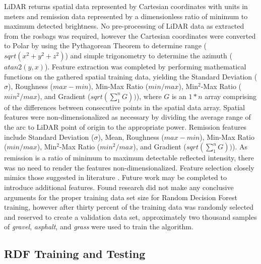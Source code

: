 \documentclass[journal,onecolumn]{IEEEtran}
\begin{document}
			{LiDAR returns spatial data represented by Cartesian coordinates with units in meters and remission data represented by a dimensionless ratio of minimum to maximum detected brightness. No pre-processing of LiDAR data as extracted from the rosbags was required, however the Cartesian coordinates were converted to Polar by using the Pythagorean Theorem to determine range ($sqrt(x^{2} + y^{2} + z^{2})$) and simple trigonometry to determine the azimuth ($atan2(y,x)$). Feature extraction was completed by performing mathematical functions on the gathered spatial training data, yielding the Standard Deviation ($\sigma$), Roughness ($max - min$), Min-Max Ratio ($min / max$), Min$^{2}$-Max Ratio ($min^2 / max$), and Gradient ($sqrt(\sum_{1}^{n} G))$), where $G$ is an $1*n$ array comprising of the differences between consecutive points in the spatial data array. Spatial features were non-dimensionalized as necessary by dividing the average range of the arc to LiDAR point of origin to the appropriate power. Remission features include Standard Deviation ($\sigma$), Mean, Roughness ($max - min$), Min-Max Ratio ($min / max$), Min$^{2}$-Max Ratio ($min^2 / max$), and Gradient ($sqrt(\sum_{1}^{n} G))$). As remission is a ratio of minimum to maximum detectable reflected intensity, there was no need to render the features non-dimensionalized. Feature selection closely mimics those suggested in literature \cite{noauthor_pdf_nodate, reymann_improving_2015}. Future work may be completed to introduce additional features. Found research did not make any conclusive arguments for the proper training data set size for Random Decision Forest training, however after thirty percent of the training data was randomly selected and reserved to create a validation data set, approximately two thousand samples of \textit{gravel}, \textit{asphalt}, and \textit{grass} were used to train the algorithm.} 


		\subsection{RDF Training and Testing}

\end{document}
